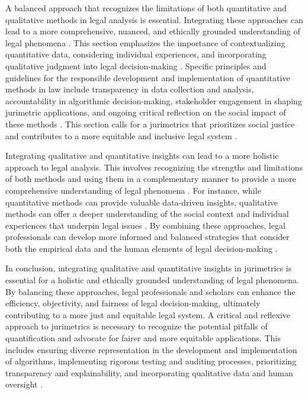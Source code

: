 A balanced approach that recognizes the limitations of both quantitative and qualitative methods in legal analysis is essential. Integrating these approaches can lead to a more comprehensive, nuanced, and ethically grounded understanding of legal phenomena \cite{10.1057/s41599-020-00557-0,10.5040/9781350220645}. This section emphasizes the importance of contextualizing quantitative data, considering individual experiences, and incorporating qualitative judgment into legal decision-making \cite{10.1057/s41599-020-00557-0,10.5040/9781350220645}. Specific principles and guidelines for the responsible development and implementation of quantitative methods in law include transparency in data collection and analysis, accountability in algorithmic decision-making, stakeholder engagement in shaping jurimetric applications, and ongoing critical reflection on the social impact of these methods \cite{10.1057/s41599-020-00557-0,10.5040/9781350220645}. This section calls for a jurimetrics that prioritizes social justice and contributes to a more equitable and inclusive legal system \cite{10.1057/s41599-020-00557-0,10.5040/9781350220645}.

Integrating qualitative and quantitative insights can lead to a more holistic approach to legal analysis. This involves recognizing the strengths and limitations of both methods and using them in a complementary manner to provide a more comprehensive understanding of legal phenomena \cite{10.1057/s41599-020-00557-0}. For instance, while quantitative methods can provide valuable data-driven insights, qualitative methods can offer a deeper understanding of the social context and individual experiences that underpin legal issues \cite{10.1057/s41599-020-00557-0}. By combining these approaches, legal professionals can develop more informed and balanced strategies that consider both the empirical data and the human elements of legal decision-making \cite{10.1057/s41599-020-00557-0}.

In conclusion, integrating qualitative and quantitative insights in jurimetrics is essential for a holistic and ethically grounded understanding of legal phenomena. By balancing these approaches, legal professionals and scholars can enhance the efficiency, objectivity, and fairness of legal decision-making, ultimately contributing to a more just and equitable legal system. A critical and reflexive approach to jurimetrics is necessary to recognize the potential pitfalls of quantification and advocate for fairer and more equitable applications. This includes ensuring diverse representation in the development and implementation of algorithms, implementing rigorous testing and auditing processes, prioritizing transparency and explainability, and incorporating qualitative data and human oversight \cite{10.1057/s41599-020-00557-0,10.1590/data.2022.65.3.267}.


